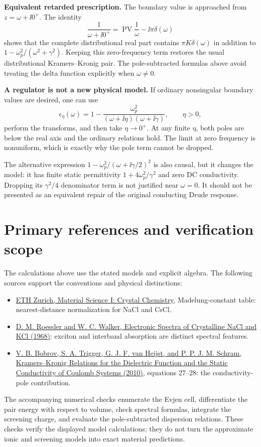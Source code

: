 \textbf{Equivalent retarded prescription.} The boundary value is approached from $z=\omega+\ii0^+$. The identity
\[
\frac1{\omega+\ii0^+}=\operatorname{PV}\frac1\omega-\ii\pi\delta(\omega)
\]
shows that the complete distributional real part contains
$\pi K\delta(\omega)$ in addition to $1-\omega_p^2/(\omega^2+\gamma^2)$. Keeping this zero-frequency term restores the usual distributional Kramers--Kronig pair. The pole-subtracted formulas above avoid treating the delta function explicitly when $\omega\ne0$.

\textbf{A regulator is not a new physical model.} If ordinary nonsingular boundary values are desired, one can use
\[
\epsilon_\eta(\omega)=1-\frac{\omega_p^2}
{(\omega+\ii\eta)(\omega+\ii\gamma)},\qquad \eta>0,
\]
perform the transforms, and then take $\eta\to0^+$. At any finite $\eta$, both poles are below the real axis and the ordinary relations hold. The limit at zero frequency is nonuniform, which is exactly why the pole term cannot be dropped.

The alternative expression $1-\omega_p^2/(\omega+\ii\gamma/2)^2$ is also causal, but it changes the model: it has finite static permittivity $1+4\omega_p^2/\gamma^2$ and zero DC conductivity. Dropping its $\gamma^2/4$ denominator term is not justified near $\omega=0$. It should not be presented as an equivalent repair of the original conducting Drude response.

\section*{Primary references and verification scope}
The calculations above use the stated models and explicit algebra. The following sources support the conventions and physical distinctions:
\begin{itemize}
\item \href{https://www.nonmet.mat.ethz.ch/education/courses/Materialwissenschaft_1/Downloads_HS_2007/slides_chapter_2.pdf}{ETH Zurich, Material Science I: Crystal Chemistry}, Madelung-constant table: nearest-distance normalization for NaCl and CsCl.
\item \href{https://doi.org/10.1103/PhysRev.166.599}{D. M. Roessler and W. C. Walker, Electronic Spectra of Crystalline NaCl and KCl (1968)}: exciton and interband absorption are distinct spectral features.
\item \href{https://arxiv.org/abs/1003.4724}{V. B. Bobrov, S. A. Trigger, G. J. F. van Heijst, and P. P. J. M. Schram, Kramers--Kronig Relations for the Dielectric Function and the Static Conductivity of Coulomb Systems (2010)}, equations 27--28: the conductivity-pole contribution.
\end{itemize}
The accompanying numerical checks enumerate the Evjen cell, differentiate the pair energy with respect to volume, check spectral formulas, integrate the screening charge, and evaluate the pole-subtracted dispersion relations. These checks verify the displayed model calculations; they do not turn the approximate ionic and screening models into exact material predictions.
